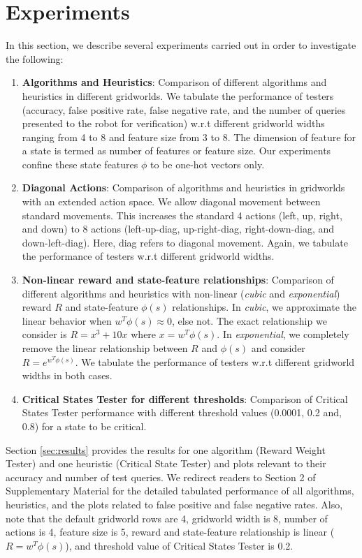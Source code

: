 \section{Experiments}
\label{sec:experiments}
In this section, we describe several experiments carried out in order to investigate the following:
\begin{enumerate}
    \item \textbf{Algorithms and Heuristics}: Comparison of different algorithms and heuristics in different gridworlds. We tabulate the performance of testers (accuracy, false positive rate, false negative rate, and the number of queries presented to the robot for verification) w.r.t different gridworld widths ranging from 4 to 8 and feature size from 3 to 8. The dimension of feature for a state is termed as number of features or feature size. Our experiments confine these state features $\phi$ to be one-hot vectors only.
    \label{enumerate:algorithms-and-heuristics}
    \item \textbf{Diagonal Actions}: Comparison of algorithms and heuristics in gridworlds with an extended action space. We allow diagonal movement between standard movements. This increases the standard 4 actions (left, up, right, and down) to 8 actions (left-up-diag, up-right-diag, right-down-diag, and down-left-diag). Here, diag refers to diagonal movement. Again, we tabulate the performance of testers w.r.t different gridworld widths.
    \label{enumerate:diagonal-action}
    \item \textbf{Non-linear reward and state-feature relationships}: Comparison of different algorithms and heuristics with non-linear (\textit{cubic} and \textit{exponential}) reward $R$ and state-feature $\phi(s)$ relationships. In \textit{cubic}, we approximate the linear behavior when $w^T \phi(s) \approx 0$, else not. The exact relationship we consider is $R = x^{3} + 10x$ where $x = w^{T}\phi(s)$. In \textit{exponential}, we completely remove the linear relationship between $R$ and $\phi(s)$ and consider $R = e^{w^{T}\phi(s)}$. We tabulate the performance of testers w.r.t different gridworld widths in both cases.
    \label{enumerate:feature-type}
    \item \textbf{Critical States Tester for different thresholds}: Comparison of Critical States Tester performance with different threshold values (0.0001, 0.2 and, 0.8) for a state to be critical.
    \label{enumerate:cst-threshold}
\end{enumerate}

Section \ref{sec:results} provides the results for one algorithm (Reward Weight Tester) and one heuristic (Critical State Tester) and plots relevant to their accuracy and number of test queries. We redirect readers to Section 2 of Supplementary Material for the detailed tabulated performance of all algorithms, heuristics, and the plots related to false positive and false negative rates. Also, note that the default gridworld rows are 4, gridworld width is 8, number of actions is 4, feature size is 5, reward and state-feature relationship is linear ($R = w^{T}\phi(s)$), and threshold value of Critical States Tester is 0.2.

